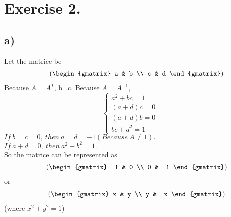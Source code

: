 \documentclass{article}
\begin{document}
\section*{Exercise 2.}
\subsection*{a)}
Let the matrice be
\begin{align*}
&\qquad\quad \left(\begin{gmatrix}
		    a & b \\
		    c & d 
\end{gmatrix}\right)\
\end{align*}
Because $A=A^T$, b=c.
Because $A=A^{-1}$, 
\begin{equation*}
\begin{cases}
a^2+bc=1\\
(a+d)c=0\\
(a+d)b=0\\
bc+d^2=1
\end{cases}
\end{equation*}
$If~b=c=0,~then~a=d=-1(Because~A\not=1).$\\
$If~a+d=0,~then~a^2+b^2=1.$\\
So the matrice can be represented as\\
\begin{align*}
&\qquad\quad \left(\begin{gmatrix}
		    -1 & 0 \\
		    0 & -1 
\end{gmatrix}\right)\
\end{align*}
or
\begin{align*}
&\qquad\quad \left(\begin{gmatrix}
		    x & y \\
		    y & -x 
\end{gmatrix}\right)\
\end{align*}
(where $x^2+y^2=1$)
\end{document}
